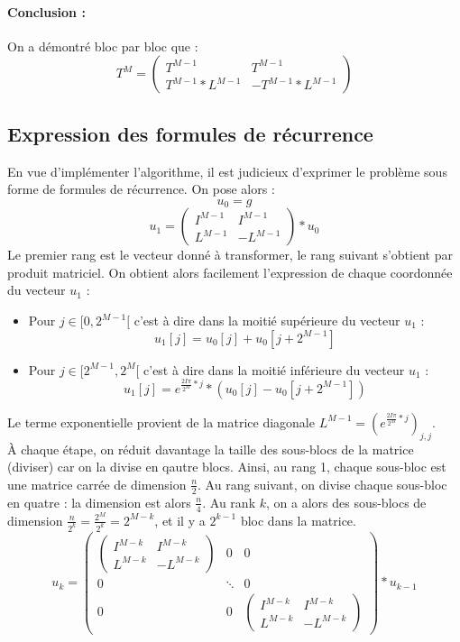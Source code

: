\documentclass{report}
\begin{document}
		\paragraph{Conclusion :} On a démontré bloc par bloc que :
		\[
			T^M = 	\begin{pmatrix}
						T^{M-1} & T^{M-1}\\
						T^{M-1}*L^{M-1} & -T^{M-1}*L^{M-1}
					\end{pmatrix}
		\]

		\subsection{Expression des formules de récurrence}
		En vue d'implémenter l'algorithme, il est judicieux d'exprimer le problème sous forme de formules de récurrence. On pose alors :
		\[ u_0 = g \]
		\[
			u_1 = 	\begin{pmatrix}
						I^{M-1} & I^{M-1}\\
						L^{M-1} & -L^{M-1}
					\end{pmatrix} * u_0
		\]
		Le premier rang est le vecteur donné à transformer, le rang suivant s'obtient par produit matriciel. On obtient alors facilement l'expression de chaque coordonnée du vecteur $u_1$ :
		\begin{itemize}
			\item Pour $j\in[0,2^{M-1}[$ c'est à dire dans la moitié supérieure du vecteur $u_1$ :
				\[ u_1[j] = u_0[j] + u_0[j+2^{M-1}] \]
			\item Pour $j\in[2^{M-1}, 2^{M}[$ c'est à dire dans la moitié inférieure du vecteur $u_1$ :
				\[ u_1[j] = e^{{\frac{2I\pi}{2^M}} * j} * (u_0[j] - u_0[j+2^{M-1}]) \]
		\end{itemize}
		Le terme exponentielle provient de la matrice diagonale $L^{M-1} = (e^{{\frac{2I\pi}{2^M}} * j})_{j,j}$.\\

		À chaque étape, on réduit davantage la taille des sous-blocs de la matrice (diviser) car on la divise en qautre blocs. Ainsi, au rang 1, chaque sous-bloc est une matrice carrée de dimension $\frac{n}{2}$. Au rang suivant, on divise chaque sous-bloc en quatre : la dimension est alors $\frac{n}{4}$. Au rank $k$, on a alors des sous-blocs de dimension ${\frac{n}{2^k}} = {\frac{2^M}{2^k}} = 2^{M-k}$, et il y a $2^{k-1}$ bloc dans la matrice.
		\[
			u_k = 	\begin{pmatrix}
						\begin{pmatrix}
							I^{M-k} & I^{M-k}\\
							L^{M-k} & -L^{M-k}
						\end{pmatrix} 			& 	0		&	0\\
						0						&	\ddots	&	0\\
						0 						& 	0 		&	\begin{pmatrix}
																	I^{M-k} & I^{M-k}\\
																	L^{M-k} & -L^{M-k}
																\end{pmatrix}
					\end{pmatrix} * u_{k-1}
		\]
\end{document}
